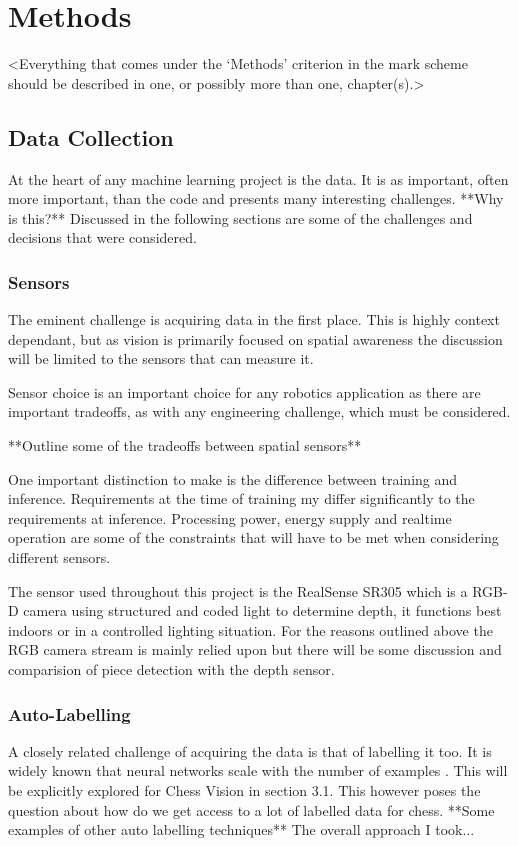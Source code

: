 \chapter{Methods}
\label{chapter2}

<Everything that comes under the `Methods' criterion in the mark scheme should be described in one, or possibly more than one, chapter(s).>

\section{Data Collection}
At the heart of any machine learning project is the data.  
It is as important, often more important, than the code and presents many interesting
challenges.  **Why is this?**
Discussed in the following sections are some of the challenges and decisions that were considered.

\subsection{Sensors}
The eminent challenge is acquiring data in the first place.  This is highly context 
dependant, but as vision is primarily focused on spatial awareness the discussion 
will be limited to the sensors that can measure it.

Sensor choice is an important choice for any robotics application as there are 
important tradeoffs, as with any engineering challenge, which must be considered.

**Outline some of the tradeoffs between spatial sensors**

One important distinction to make is the difference between training and inference.
Requirements at the time of training my differ significantly to the requirements at 
inference.  Processing power, energy supply and realtime operation are some
of the constraints that will have to be met when considering different sensors.

The sensor used throughout this project is the RealSense SR305 which is a RGB-D camera
using structured and coded light to determine depth, it functions best indoors or in a 
controlled lighting situation.  For the reasons outlined above the RGB camera stream is 
mainly relied upon but there will be some discussion and comparision of piece detection 
with the depth sensor.  

\subsection{Auto-Labelling}
A closely related challenge of acquiring the data is that of labelling it too.
It is widely known that neural networks scale with the number of examples \cite{}.  
This will be explicitly explored for Chess Vision in section 3.1.
This however poses the question about how do we get access to a lot of labelled data 
for chess.  **Some examples of other auto labelling techniques**
The overall approach I took...

